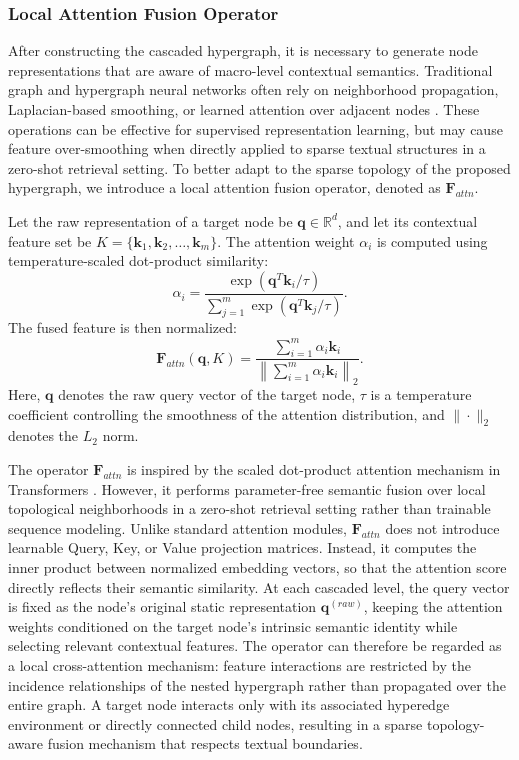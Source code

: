 \documentclass[a4paper,fleqn]{cas-dc}
\begin{document}
\subsubsection{Local Attention Fusion Operator}

After constructing the cascaded hypergraph, it is necessary to generate node representations that are aware of macro-level contextual semantics. Traditional graph and hypergraph neural networks often rely on neighborhood propagation, Laplacian-based smoothing, or learned attention over adjacent nodes \citep{Wu2021GNNSurvey}. These operations can be effective for supervised representation learning, but may cause feature over-smoothing when directly applied to sparse textual structures in a zero-shot retrieval setting. To better adapt to the sparse topology of the proposed hypergraph, we introduce a local attention fusion operator, denoted as $\mathbf{F}_{attn}$.

Let the raw representation of a target node be $\mathbf{q} \in \mathbb{R}^{d}$, and let its contextual feature set be $K=\{\mathbf{k}_1,\mathbf{k}_2,\ldots,\mathbf{k}_m\}$. The attention weight $\alpha_i$ is computed using temperature-scaled dot-product similarity:
\begin{equation}
\alpha_i =
\frac{
\exp\left(\mathbf{q}^{T}\mathbf{k}_i/\tau\right)
}{
\sum_{j=1}^{m} \exp\left(\mathbf{q}^{T}\mathbf{k}_j/\tau\right)
}.
\end{equation}
The fused feature is then normalized:
\begin{equation}
\mathbf{F}_{attn}(\mathbf{q},K)
=
\frac{
\sum_{i=1}^{m} \alpha_i \mathbf{k}_i
}{
\left\|\sum_{i=1}^{m} \alpha_i \mathbf{k}_i\right\|_2
}.
\end{equation}
Here, $\mathbf{q}$ denotes the raw query vector of the target node, $\tau$ is a temperature coefficient controlling the smoothness of the attention distribution, and $\|\cdot\|_2$ denotes the $L_2$ norm.

The operator $\mathbf{F}_{attn}$ is inspired by the scaled dot-product attention mechanism in Transformers \citep{Vaswani2017Attention}. However, it performs parameter-free semantic fusion over local topological neighborhoods in a zero-shot retrieval setting rather than trainable sequence modeling. Unlike standard attention modules, $\mathbf{F}_{attn}$ does not introduce learnable Query, Key, or Value projection matrices. Instead, it computes the inner product between normalized embedding vectors, so that the attention score directly reflects their semantic similarity. At each cascaded level, the query vector is fixed as the node's original static representation $\mathbf{q}^{(raw)}$, keeping the attention weights conditioned on the target node's intrinsic semantic identity while selecting relevant contextual features. The operator can therefore be regarded as a local cross-attention mechanism: feature interactions are restricted by the incidence relationships of the nested hypergraph rather than propagated over the entire graph. A target node interacts only with its associated hyperedge environment or directly connected child nodes, resulting in a sparse topology-aware fusion mechanism that respects textual boundaries.
\end{document}
